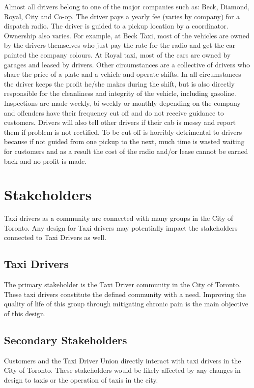 \documentclass[11pt]{article}
\begin{document}
Almost all drivers belong to one of the major companies such as: Beck, Diamond, Royal, City and
Co-op. The driver pays a yearly fee (varies by company) for a dispatch radio. The 
driver is guided to a pickup location by a coordinator. Ownership also varies. For example, 
at Beck Taxi, most of the vehicles are owned by the drivers themselves who just pay the 
rate for the radio and get the car painted the company colours. At Royal taxi, most of the 
cars are owned by garages and leased by drivers. Other circumstances are a collective of 
drivers who share the price of a plate and a vehicle and operate shifts. In all 
circumstances the driver keeps the profit he/she makes during the shift, but is also 
directly responsible for the cleanliness and integrity of the vehicle, including gasoline. 
Inspections are made weekly, bi-weekly or monthly depending on the company and offenders 
have their frequency cut off and do not receive guidance to customers. Drivers will also 
tell other drivers if their cab is messy and report them if problem is not rectified. To 
be cut-off is horribly detrimental to drivers because if not guided from one pickup to 
the next, much time is wasted waiting for customers and as a result the cost of the radio 
and/or lease cannot be earned back and no profit is made\cite{thestar2012, Gowder2013}.

\section{Stakeholders}
\label{sec:stake}
Taxi drivers as a community are connected with many groups in the City
of Toronto. Any design for Taxi drivers may potentially impact the
stakeholders connected to Taxi Drivers as well.
 
\subsection{Taxi Drivers}
The primary stakeholder is the Taxi Driver community in the City of
Toronto. These taxi drivers constitute the defined community with a
need. Improving the quality of life of this group through mitigating
chronic pain is the main objective of this design.
 
\subsection{Secondary Stakeholders} 
Customers and the Taxi Driver Union directly interact with taxi 
drivers in the City of Toronto. These stakeholders would be likely 
affected by any changes in design to taxis or the operation of taxis 
in the city. 
\end{document}
